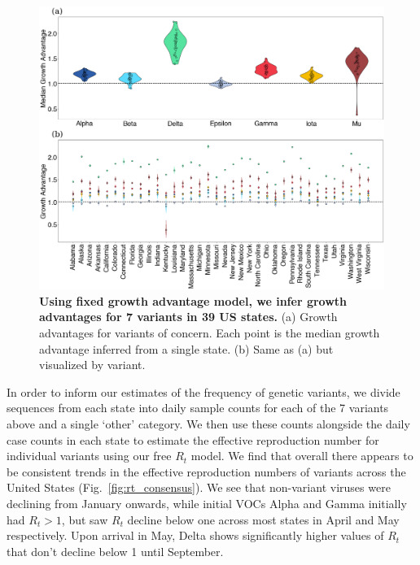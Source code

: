 \documentclass[11pt,oneside,letterpaper]{article}
\begin{document}
\begin{figure}[t]
  \centering
  \includegraphics[width=\linewidth]{figs/growth_advantages.png}
  \caption{\textbf{Using fixed growth advantage model, we infer growth advantages for 7 variants in 39 US states.}
  (a) Growth advantages for variants of concern. Each point is the median growth advantage inferred from a single state.
  (b) Same as (a) but visualized by variant.}
  \label{fig:growth_advantages}
\end{figure}

In order to inform our estimates of the frequency of genetic variants, we divide sequences from each state into daily sample counts for each of the 7 variants above and a single `other' category.
We then use these counts alongside the daily case counts in each state to estimate the effective reproduction number for individual variants using our free $R_{t}$ model.
We find that overall there appears to be consistent trends in the effective reproduction numbers of variants across the United States (Fig.\ \ref{fig:rt_consensus}).
We see that non-variant viruses were declining from January onwards, while initial VOCs Alpha and Gamma initially had $R_t>1$, but saw $R_t$ decline below one across most states in April and May respectively.
Upon arrival in May, Delta shows significantly higher values of $R_t$ that don't decline below 1 until September.
\end{document}

